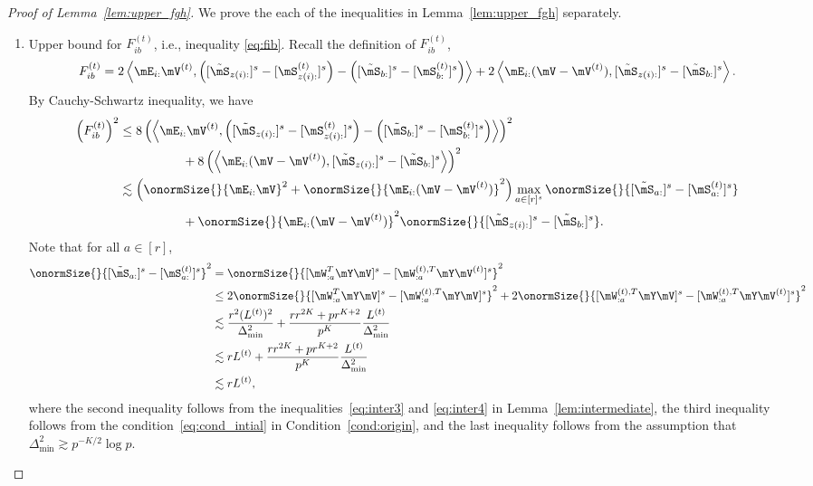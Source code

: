 \documentclass[lettersize,onecolumn,journal]{IEEEtran}
\theoremstyle{definition}
\theoremstyle{definition}
\newcommand{\of}[1]{\left(#1\right)}
\newcommand{\ang}[1]{\left\langle#1\right\rangle}
\begin{document}
\begin{proof}[Proof of Lemma~\ref{lem:upper_fgh}]
We prove the each of the inequalities in Lemma~\ref{lem:upper_fgh} separately.
\begin{enumerate}[wide]
    \item Upper bound for $F_{ib}^{(t)}$, i.e., inequality \eqref{eq:fib}. Recall the definition of $F_{ib}^{(t)}$,
    \begin{align}
         F_{ib}^{(t)} = 2 \ang{\mE_{i:} \mV^{(t)}, \of{ [ \tilde \mS_{z(i):} ]^s  - [\mS_{z(i):}^{(t)} ]^s  }  - \of{  [  \tilde \mS_{b:} ]^s  - [ \mS_{b:}^{(t)} ]^s  }  }  + 2 \ang{ \mE_{i:}(\mV - \mV^{(t)} ), [ \tilde \mS_{z(i):} ]^s - [ \tilde \mS_{b:} ]^s  }.
    \end{align}
    By Cauchy-Schwartz inequality, we have 
    \begin{align}
        \of{F_{ib}^{(t)}}^2 & \leq 8 \of{\ang{\mE_{i:} \mV^{(t)}, \of{ [  \tilde \mS_{z(i):} ]^s  -  [  \mS_{z(i):}^{(t)} ]^s  }  - \of{  [  \tilde \mS_{b:} ]^s  -  [  \mS_{b:}^{(t)} ]^s  }  }  }^2 \\
         & \quad \quad \quad \quad \quad + 8\of{ \ang{ \mE_{i:} (\mV - \mV^{(t)} ), [  \tilde \mS_{z(i):} ]^s - [ \tilde  \mS_{b:} ]^s  }}^2 \\
         & \lesssim \of{ \onormSize{}{\mE_{i:} \mV}^2 + \onormSize{}{\mE_{i:} ( \mV - \mV^{(t)} )}^2 } \max_{a \in [r]^s} \onormSize{}{  [  \tilde \mS_{a:} ]^s - [   \mS_{a:}^{(t)} ]^s  } \\
          & \quad \quad \quad \quad \quad +\onormSize{}{\mE_{i:} ( \mV - \mV^{(t)} )}^2  \onormSize{}{  [  \tilde \mS_{z(i):} ]^s - [  \tilde \mS_{b:} ]^s  }. \label{eq:fib_decomp}
    \end{align}
    Note that for all $a \in [r]$,
    \begin{align}
        \onormSize{}{  [  \tilde \mS_{a:} ]^s - [   \mS_{a:}^{(t)} ]^s  }^2 &= \onormSize{}{ [ \mW_{:a}^T \mY \mV ]^s - [ \mW_{:a}^{(t),T} \mY \mV^{(t)} ]^s }^2 \\
        &\leq 2 \onormSize{}{ [ \mW_{:a}^T \mY \mV ]^s  - [ \mW_{:a}^{(t),T} \mY \mV ]^s  }^2 + 2 \onormSize{}{[ \mW_{:a}^{(t),T} \mY \mV ]^s - [ \mW_{:a}^{(t),T} \mY \mV^{(t)} ]^s }^2\\
        & \lesssim \frac{ r^2 (L^{(t)})^2}{ \Delta_{\min}^2} + \frac{ r r^{2K} + p r^{K+2}}{p^K} \frac{L^{(t)}}{\Delta_{\min}^2}\\
        & \lesssim r L^{(t)}+  \frac{ r r^{2K} + p r^{K+2}}{p^K} \frac{L^{(t)}}{\Delta_{\min}^2}\\
        & \lesssim r L^{(t)},\label{eq:fib_1}
    \end{align}
    where the second inequality follows from the inequalities~\eqref{eq:inter3} and \eqref{eq:inter4} in Lemma~\ref{lem:intermediate}, the third inequality follows from the condition~\eqref{eq:cond_intial} in Condition~\ref{cond:origin}, and the last inequality follows from the assumption that $\Delta_{\min}^2 \gtrsim p^{-K/2}\log p$. 
    

\end{enumerate}
\end{proof}
\end{document}
